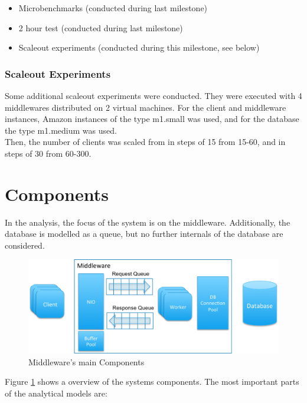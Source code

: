 \documentclass[a4paper]{article}
\begin{document}
{\begin{itemize}
\item Microbenchmarks (conducted during last milestone)
\item 2 hour test (conducted during last milestone)
\item Scaleout experiments (conducted during this milestone, see below)
\end{itemize}

\subsubsection{Scaleout Experiments}

Some additional scaleout experiments were conducted. They were executed with 4 middlewares distributed on 2 virtual machines. For the client and middleware instances, Amazon instances of the type m1.small was used, and for the database the type m1.medium was used.\\
\noindent Then, the number of clients was scaled from in steps of 15 from 15-60, and in steps of 30 from 60-300.


\section{Components}

In the analysis, the focus of the system is on the middleware. Additionally, the database is modelled as a queue, but no further internals of the database are considered.\\

\begin{figure}[H]
	\begin{center}
    \includegraphics[scale=0.6]{../drawings/broker-threading.png}
  \end{center}
  \caption{Middleware's main Components}
  \label{fig:middleware-threading}
\end{figure}

Figure \ref{fig:middleware-threading} shows a overview of the systems components. The most important parts of the analytical models are:

}
\end{document}
